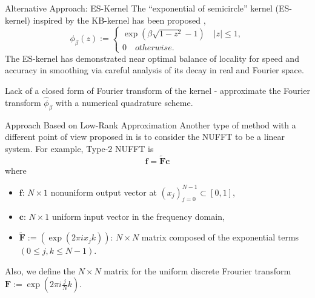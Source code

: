 \documentclass{beamer}
\begin{document}
\begin{frame}{Alternative Approach: ES-Kernel}
  The ``exponential of semicircle'' kernel (ES-kernel) inspired by the KB-kernel has been proposed
  \cite{SISC-2019-Barnett}, \cite{IEEE-2021-Barnett}
  \begin{equation}
    \phi_{\beta}(z) :=
    \begin{cases}
      \exp\left(\beta\sqrt{1-z^2} - 1\right) \quad |z| \le 1,\\
      0 \quad otherwise.
    \end{cases}
    \label{eq:ES-kernel}
  \end{equation}
  The ES-kernel has demonstrated near optimal balance of locality for speed and accuracy in smoothing via careful analysis of its decay in real and Fourier space.

  Lack of a closed form of Fourier transform of the kernel - approximate the Fourier transform $\hat{\phi}_{\beta}$ with a numerical quadrature scheme.
\end{frame}

\begin{frame}{Approach Based on Low-Rank Approximation}
  Another type of method with a different point of view proposed in \cite{SISC-2018-Townsend}
  is to consider the NUFFT to be a linear system. For example, Type-$2$ NUFFT is
  \begin{equation}
    \bm{f} = \tilde{\bm{F}}\bm{c}
    \label{eq:matrix-vector-product-nufft-type-2}
  \end{equation}
  where
  \begin{itemize}
    \item $\bm{f}$: $N \times 1$ nonuniform output vector at $(x_j)_{j=0}^{N-1} \subset [0, 1]$,
    \item $\bm{c}$: $N \times 1$ uniform input vector in the frequency domain,
    \item $\tilde{\bm{F}} := \left(\exp(2\pi i x_{j}k)\right)$: $N \times N$ matrix composed of the exponential terms
    $(0 \le j, k \le N-1)$.
  \end{itemize}
  Also, we define the $N \times N$ matrix for the uniform discrete Frourier transform
  $\bm{F} := \exp(2\pi i \frac{j}{N}k)$.
\end{frame}
\end{document}
